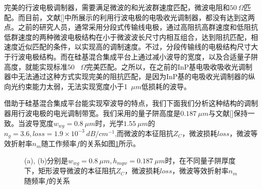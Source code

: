 完美的行波电极调制器，需要满足微波的和光波群速度匹配，微波电阻和$50~\Omega$匹配。而目前，文献[]中所展示的利用行波电极的电吸收光调制器，都没有达到这两点。之前的研究人员，通常采用分段式传输线电极，通过高阻抗高群速度和低阻抗低群速度的两种微波电极结构在小于微波波长尺寸内相互组合，达到阻抗匹配，相速度近似匹配的条件，以实现高的调制速度\cite{tang2012over,yuphd,Robertphd}。不过，分段传输线的电极结构尺寸大于行波电极结构。而在硅基混合集成平台上通过减小波导的宽度，以及合适量子阱高度，就能实现标准50~ $\Omega$完美匹配。之所以，在之前的InP基电吸收吸收光调制器中无法通过这种方式实现完美的阻抗匹配，是因为InP基的电吸收光调制器的纵向光约束能力太弱，无法实现宽度小于1~$\mu m$低损耗的波导。

借助于硅基混合集成平台能实现窄波导的特点，我们下面我们分析这种结构的调制器用行波电极的电光调制带宽。我们采用的量子阱高度是$0.187~ \mu m$与文献[]保持一致。当波导宽度$w_{wg} = 0.8~ \mu m$时，光学$1.55~ \mu m$的$n_g = 3.6, loss = 1.9 \times 10^{-3} ~dB/cm^{-1} $,而微波的本征阻抗$Z_C$，微波损耗$loss$，微波等效折射率$n_m$随工作频率$f$的关系如图\ref{fig_ch2_rect_freq_property}所示。
\begin{figure}[htb]
	\small
\caption{(a), (b)分别是$w_{wg} = 0.8 ~\mu m, h_{mqw} = 0.187 ~\mu m$时，在不同量子阱厚度下，矩形波导微波的本征阻抗$Z_C$，微波损耗$loss$，微波等效折射率$n_m$随频率$f$的关系}
\label{fig_ch2_rect_freq_property}	
\end{figure}

